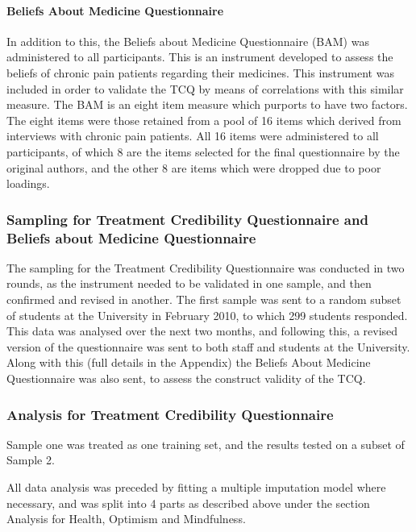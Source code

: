 \paragraph{Beliefs About Medicine Questionnaire}

In addition to this, the Beliefs about Medicine Questionnaire (BAM) was administered to all participants. This is an instrument developed to assess the beliefs of chronic pain patients regarding their medicines\cite{Horne1999}. This instrument was included in order to validate the TCQ by means of correlations with this similar measure. The BAM is an eight item measure which purports to have two factors. The eight items were those retained from a pool of 16 items which derived from interviews with chronic pain patients. All 16 items were administered to all participants, of which 8 are the items selected for the final questionnaire by the original authors, and the other 8 are items which were dropped due to poor loadings.

\subsubsection{Sampling for Treatment Credibility Questionnaire and Beliefs about Medicine Questionnaire}

The sampling for the Treatment Credibility Questionnaire was conducted in two rounds, as the instrument needed to be validated in one sample, and then confirmed and revised in another. The first sample was sent to a random subset of students at the University in February 2010, to which 299 students responded. This data was analysed over the next two months, and following this, a revised version of the questionnaire was sent to both staff and students at the University. Along with this (full details in the Appendix) the Beliefs About Medicine Questionnaire was also sent, to assess the construct validity of the TCQ.

\subsubsection{Analysis for Treatment Credibility Questionnaire}

Sample one was treated as one training set, and the results tested on a subset of Sample 2. 

All data analysis was preceded by fitting a multiple imputation model where necessary, and was split into 4 parts as described above under the section Analysis for Health, Optimism and Mindfulness.

